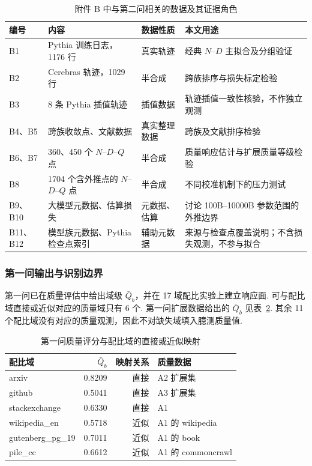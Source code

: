 \begin{table}[htbp]
\centering\small
\caption{附件 B 中与第二问相关的数据及其证据角色}
\label{tab:data}
\begin{tabular}{P{1.2cm}P{3.3cm}P{2.0cm}P{7.0cm}}
\toprule
编号 & 内容 & 数据性质 & 本文用途\\
\midrule
B1 & Pythia 训练日志，1176 行 & 真实轨迹 & 经典 $N$--$D$ 主拟合及分组验证\\
B2 & Cerebras 轨迹，1029 行 & 半合成 & 跨族排序与损失标定检验\\
B3 & 8 条 Pythia 插值轨迹 & 插值数据 & 轨迹插值一致性核验，不作独立观测\\
B4、B5 & 跨族收敛点、文献数据 & 真实整理数据 & 跨族及文献排序检验\\
B6、B7 & 360、450 个 $N$--$D$--$Q$ 点 & 半合成 & 质量响应估计与扩展质量等级检验\\
B8 & 1704 个含外推点的 $N$--$D$--$Q$ 点 & 半合成 & 不同校准机制下的压力测试\\
B9、B10 & 大模型元数据、估算损失 & 元数据、估算 & 讨论 100B--10000B 参数范围的外推边界\\
B11、B12 & 模型族元数据、Pythia 检查点索引 & 辅助元数据 & 来源与检查点覆盖说明；不含损失观测，不参与拟合\\
\bottomrule
\end{tabular}
\end{table}

\subsubsection{第一问输出与识别边界}

第一问已在质量评估中给出域级 \(\bar Q_b\)，并在 17 域配比实验上建立响应面. 可与配比域直接或近似对应的质量域只有 6 个. 第一问扩展数据给出的 \(\bar Q_b\) 见表~\ref{tab:qmap}. 其余 11 个配比域没有对应的质量观测，因此不对缺失域填入臆测质量值. 

\begin{table}[H]
\centering\small
\caption{第一问质量评分与配比域的直接或近似映射}
\label{tab:qmap}
\begin{tabular}{lrrl}
\toprule
配比域 & \(\bar Q_b\) & 映射关系 & 质量数据\\
\midrule
arxiv & 0.8209 & 直接 & A2 扩展集\\
github & 0.5041 & 直接 & A3 扩展集\\
stackexchange & 0.6330 & 直接 & A1\\
wikipedia\_en & 0.5718 & 近似 & A1 的 wikipedia\\
gutenberg\_pg\_19 & 0.7011 & 近似 & A1 的 book\\
pile\_cc & 0.6612 & 近似 & A1 的 commoncrawl\\
\bottomrule
\end{tabular}
\end{table}

